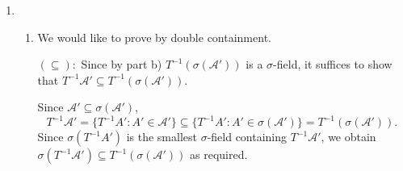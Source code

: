 \documentclass[12pt]{article}
\begin{document}
\begin{problem}[1]
\begin{enumerate}[label=\alph*)]
	\item 
		~\begin{enumerate}[label=(\roman*)]
			\item We would like to prove by double containment.

				$ (\subseteq) :$ Since by part b) $ T^{-1}( \sigma(\mathcal{A}'))$ is a $\sigma$-field, it suffices to show that $ T^{-1}\mathcal{A}' \subseteq T^{-1}( \sigma(\mathcal{A}'))$.

				Since $ \mathcal{A}' \subseteq  \sigma(\mathcal{A}')$,
				\[
					T^{-1}\mathcal{A}'= \{T^{-1}A': A' \in \mathcal{A}' \}  \subseteq \{T^{-1}A': A' \in \sigma(\mathcal{A}')\} = T^{-1}( \sigma(\mathcal{A}'))
				.\]
				Since $ \sigma(T^{-1}A')$ is the smallest $\sigma$-field containing $ T^{-1}\mathcal{A}'$, we obtain $ \sigma(T^{-1}\mathcal{A}') \subseteq T^{-1}( \sigma(\mathcal{A}'))$ as required.


\end{enumerate}
\end{enumerate}
\end{problem}
\end{document}
